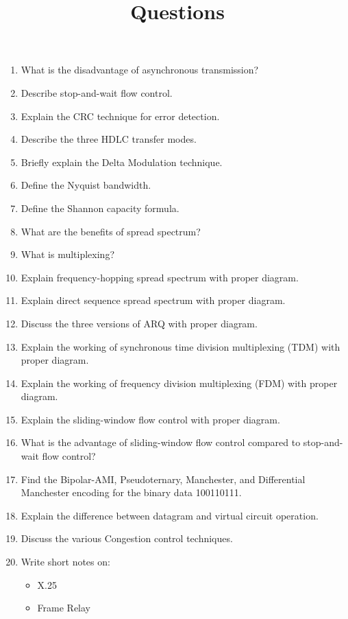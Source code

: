 \documentclass{article}
\begin{document}
\title{Questions}
\author{}
\date{}
\maketitle

\begin{enumerate}
    \item What is the disadvantage of asynchronous transmission?
    \item Describe stop-and-wait flow control.
    \item Explain the CRC technique for error detection.
    \item Describe the three HDLC transfer modes.
    \item Briefly explain the Delta Modulation technique.
    \item Define the Nyquist bandwidth.
    \item Define the Shannon capacity formula.
    \item What are the benefits of spread spectrum?
    \item What is multiplexing?
    \item Explain frequency-hopping spread spectrum with proper diagram.
    \item Explain direct sequence spread spectrum with proper diagram.
    \item Discuss the three versions of ARQ with proper diagram.
    \item Explain the working of synchronous time division multiplexing (TDM) with proper diagram.
    \item Explain the working of frequency division multiplexing (FDM) with proper diagram.
    \item Explain the sliding-window flow control with proper diagram.
    \item What is the advantage of sliding-window flow control compared to stop-and-wait flow control?
    \item Find the Bipolar-AMI, Pseudoternary, Manchester, and Differential Manchester encoding for the binary data 100110111.
    \item Explain the difference between datagram and virtual circuit operation.
    \item Discuss the various Congestion control techniques.
    \item Write short notes on:
    \begin{itemize}
        \item X.25
        \item Frame Relay

\end{itemize}
\end{enumerate}
\end{document}
